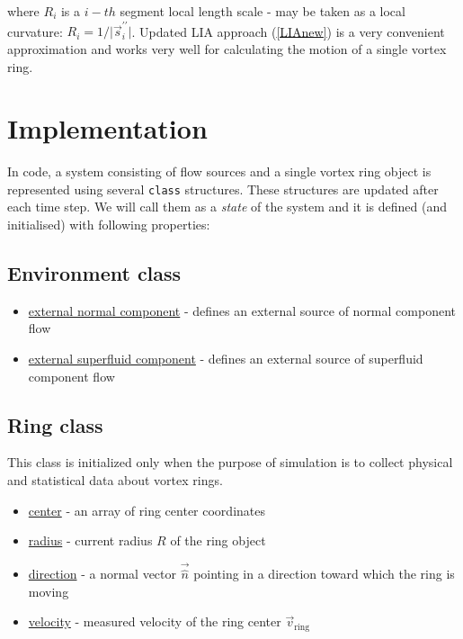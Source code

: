 where $R_i$ is a $i-th$ segment local length scale - may be taken \cite{barenghi} as a local curvature: $R_i = 1 / \vert \vec{s}^{\prime \prime}_i \vert$. Updated LIA approach (\ref{LIAnew}) is a very convenient approximation and works very well for calculating the motion of a single vortex ring.

\section{Implementation}

In code, a system consisting of flow sources and a single vortex ring object is represented using several \texttt{class} structures. These structures are updated after each time step. We will call them as a \textit{state} of the system and it is defined (and initialised) with following properties:


\subsection*{Environment class}

\begin{itemize}
	\item \underline{external normal component} - defines an external source of normal component flow
	\item \underline{external superfluid component} - defines an external source of superfluid component flow
\end{itemize}

\subsection*{Ring class}

This class is initialized only when the purpose of simulation is to collect physical and statistical data about vortex rings.

\begin{itemize}
	\item \underline{center} - an array of ring center coordinates
	\item \underline{radius} - current radius $R$ of the ring object
	\item \underline{direction} - a normal vector $\vec{\hat{n}}$ pointing in a direction toward which the ring is moving
	\item \underline{velocity} - measured velocity of the ring center $\vec{v}_{\text{ring}}$
\end{itemize}


